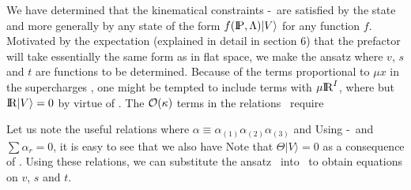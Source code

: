 We have determined that the kinematical constraints
\breqone-\freqtwo\ are satisfied by the state
\eqn{}
and more generally by any state of the form $f(\relax{\rm I\kern-.18em P}, \Lambda)|V\rangle$
for any function $f$.
Motivated by the expectation (explained in detail
in section 6) that the prefactor will take essentially
the same form as in flat space, we make the ansatz
\eqn{}
where $v$, $s$ and $t$ are functions to be determined.
Because of the terms proportional to $\mu x$ in the supercharges
\sgalg,
one might be tempted to include terms with $\mu \relax{\rm I\kern-.18em R}^I$, where
\eqn{}
but $\relax{\rm I\kern-.18em R}|V\rangle = 0$ by virtue of \ronv.
The ${\cal{O}}(\kappa)$ terms in the relations \reqrel\ require
\eqn{}

Let us note the useful relations
\eqn{}
where $\alpha \equiv \alpha_{(1)} \alpha_{(2)} \alpha_{(3)}$ and
\eqn{}
Using \breqone-\freqtwo\ and $\sum \alpha_r = 0$, it is easy to see that
we also have
\eqn{}
Note that $\Theta|V\rangle = 0$ as a consequence
of \thetaonv.
Using these relations, we can substitute the ansatz \ansatz\ into
\reqalg\ to obtain equations on $v$, $s$ and $t$.


